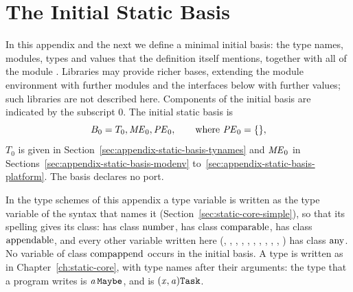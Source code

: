 
\chapter{The Initial Static Basis}\label{ch:appendix-static-basis}

In this appendix and the next we define a minimal initial basis: the type
names, modules, types and values that the definition itself mentions, together
with all of the module . %
Libraries may provide richer bases, extending the module environment with
further modules and the interfaces below with further values; such libraries
are not described here. Components of the initial basis are indicated by the
subscript 0. The initial static basis is
\[
  B_0 = T_0, \mathit{ME}_0, \mathit{PE}_0, \qquad\text{where}\ \mathit{PE}_0 = \{\},
\]
$T_0$ is given in Section~\ref{sec:appendix-static-basis-tynames} and $\mathit{ME}_0$
in Sections~\ref{sec:appendix-static-basis-modenv}
to~\ref{sec:appendix-static-basis-platform}. The basis declares no port.

In the type schemes of this appendix a type variable is written as the type
variable of the syntax that names it (Section~\ref{sec:static-core-simple}), so
that its spelling gives its class:  has class $\mathrm{number}$,
 has class $\mathrm{comparable}$,  has class $\mathrm{appendable}$, and
every other variable written here (, , , , ,
, , , , , ) has class $\mathrm{any}$. %
No variable of class $\mathrm{compappend}$ occurs in the initial basis. A type is written as
in Chapter~\ref{ch:static-core}, with type names after their arguments: the
type that a program writes  is $\mathit{a}\,\mathtt{Maybe}$, and  is $(\mathit{x}, \mathit{a})\mathtt{Task}$.

